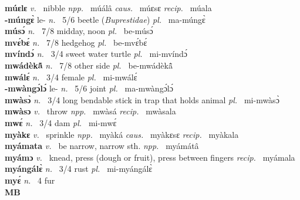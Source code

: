 {\bfseries múɛlɛ}  {\itshape v.~} nibble   {\itshape npp.~} múálâ {\itshape caus.~} múɛsɛ {\itshape recip.~} múala  \\ 
{\bfseries -múngɛ̀} le- {\itshape n.~} 5/6 beetle ({\itshape Buprestidae}) {\itshape pl.~} ma-múngɛ̀    \\ 
{\bfseries músɔ́}  {\itshape n.~} 7/8 midday, noon {\itshape pl.~} be-músɔ́    \\ 
{\bfseries mvɛ́bɛ́}  {\itshape n.~} 7/8 hedgehog {\itshape pl.~} be-mvɛ́bɛ́    \\ 
{\bfseries mvíndɔ́}  {\itshape n.~} 3/4 sweet water turtle {\itshape pl.~} mi-mvíndɔ́    \\ 
{\bfseries mwádèkã̂}  {\itshape n.~} 7/8 other side {\itshape pl.~} be-mwádèkã̂    \\ 
{\bfseries mwálɛ́}  {\itshape n.~} 3/4 female {\itshape pl.~} mi-mwálɛ́    \\ 
{\bfseries -mwàngɔ́lɔ́} le- {\itshape n.~} 5/6 joint {\itshape pl.~} ma-mwàngɔ́lɔ́    \\ 
{\bfseries mwàsɔ̀}  {\itshape n.~} 3/4 long bendable stick in trap that holds animal {\itshape pl.~} mi-mwàsɔ̀    \\ 
{\bfseries mwàsɔ}  {\itshape v.~} throw   {\itshape npp.~} mwàsá {\itshape recip.~} mwàsala  \\ 
{\bfseries mwɛ́}  {\itshape n.~} 3/4 dam {\itshape pl.~} mi-mwɛ́    \\ 
{\bfseries myàkɛ}  {\itshape v.~} sprinkle   {\itshape npp.~} myàká {\itshape caus.~} myàkɛsɛ {\itshape recip.~} myàkala  \\ 
{\bfseries myámata}  {\itshape v.~} be narrow, narrow sth.   {\itshape npp.~} myámátâ  \\ 
{\bfseries myámɔ}  {\itshape v.~} knead, press (dough or fruit), press between fingers {\itshape recip.~} myámala \\ 
{\bfseries myángálɛ̀}  {\itshape n.~} 3/4 rust {\itshape pl.~} mi-myángálɛ̀    \\ 
{\bfseries myɛ́}  {\itshape n.~} 4 fur    \\ 

\medskip
\noindent \large {\bfseries MB}\normalsize\\
\medskip

